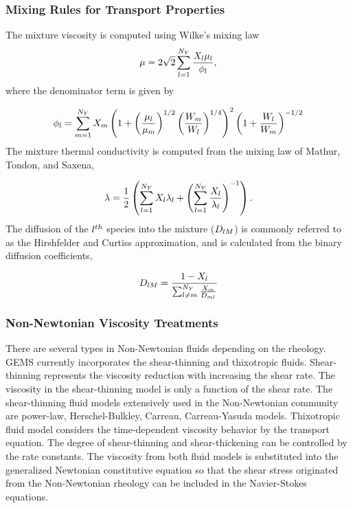 \subsubsection{Mixing Rules for Transport Properties}

The mixture viscosity is computed using Wilke's mixing law
\begin{equation}
	\mu = 2 \sqrt{2} \sum_{l = 1}^{N_Y} \frac{X_{l} \mu_{l}}{\phi_{l}},
\end{equation}
where the denominator term is given by

\begin{equation}
	\phi_{l} = \sum_{m = 1}^{N_Y} X_{m} \left( 1 + \left( \frac{\mu_{l}}{\mu_{m}} \right)^{1/2} \left( \frac{W_{m}}{W_{l}} \right)^{1/4} \right)^2 \left( 1 + \frac{W_{l}}{W_{m}} \right)^{-1/2}
\end{equation}
The mixture thermal conductivity is computed from the mixing law of Mathur, Tondon, and Saxena,

\begin{equation}
	\lambda = \frac{1}{2} \left( \sum_{l = 1}^{N_Y} X_{l} \lambda_{l} + \left(\sum_{l = 1}^{N_Y} \frac{X_{l}}{\lambda_{l}} \right)^{-1} \right).
\end{equation}
The diffusion of the $l^{th}$ species into the mixture ($D_{l M}$) is commonly referred to as the Hirshfelder and Curtiss approximation, and is calculated from the binary
diffusion coefficients,

\begin{equation}
	D_{l M} = \frac{1 - X_{l}}{\sum_{l \neq m}^{N_Y} \frac{X_{m}}{D_{m l}}}
\end{equation}

\subsubsection{Non-Newtonian Viscosity Treatments}

There are several types in Non-Newtonian fluids depending on the rheology. GEMS currently incorporates the shear-thinning and thixotropic fluids. Shear-thinning represents the viscosity reduction with increasing the shear rate. The viscosity in the shear-thinning model is only a function of the shear rate. The shear-thinning fluid models extensively used in the Non-Newtonian community are power-law, Herschel-Bulkley, Carreau, Carreau-Yasuda models. Thixotropic fluid model considers the time-dependent viscosity behavior by the transport equation. The degree of
shear-thinning and shear-thickening can be controlled by the rate constants. The viscosity from both fluid models is substituted into the generalized Newtonian constitutive equation so that the shear stress originated from the Non-Newtonian rheology can be included in the Navier-Stokes equations.

